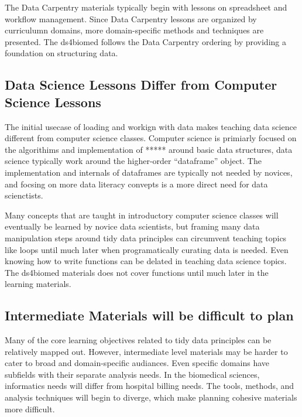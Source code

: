 \documentclass[030-workshop.tex]{subfiles}
\begin{document}
            The Data Carpentry materials typically begin with lessons on spreadsheet and workflow management.
            Since Data Carpentry lessons are organized by curriculumn domains,
            more domain-specific methods and techniques are presented.
            The ds4biomed follows the Data Carpentry ordering by providing a foundation on structuring data.

    \subsection{Data Science Lessons Differ from Computer Science Lessons}

        The initial usecase of loading and workign with data makes teaching data science different from computer science classes.
        Computer science is primiarly focused on the algorithims and implementation of ***** around basic data structures,
        data science typically work around the higher-order ``dataframe'' object.
        The implementation and internals of dataframes are typically not needed by novices,
        and focsing on more data literacy convepts is a more direct need for data scienctists.

        Many concepts that are taught in introductory computer science classes will eventually be learned by novice data scientists,
        but framing many data manipulation steps around tidy data principles can circumvent
        teaching topics like loops until much later when programatically curating data is needed.
        Even knowing how to write functions can be delated in teaching data science topics.
        The ds4biomed materials does not cover functions until much later in the learning materials.

    \subsection{Intermediate Materials will be difficult to plan}

        Many of the core learning objectives related to tidy data principles can be relatively mapped out.
        However, intermediate level materials may be harder to cater to broad and domain-specific audiances.
        Even specific domains have subfields with their separate analysis needs.
        In the biomedical sciences, informatics needs will differ from hospital billing needs.
        The tools, methods, and analysis techniques will begin to diverge, which make planning
        cohesive materials more difficult.
\end{document}
